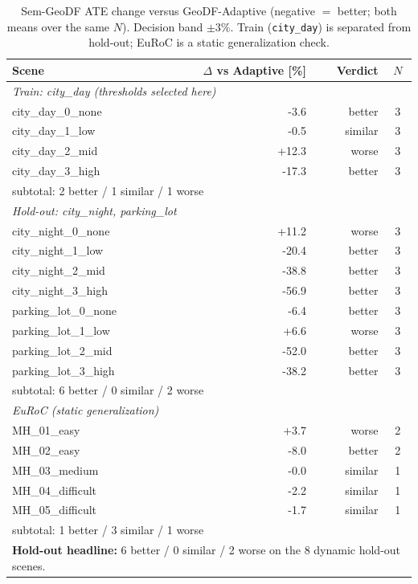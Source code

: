 \begin{table}[t]
\centering
\caption{Sem-GeoDF ATE change versus GeoDF-Adaptive (negative $=$ better; both means over the same $N$). Decision band $\pm 3\%$. Train (\texttt{city\_day}) is separated from hold-out; EuRoC is a static generalization check.}
\label{tab:delta_adaptive}
\begin{tabular}{lrrc}
\toprule
Scene & $\Delta$ vs Adaptive [\%] & Verdict & $N$ \\
\midrule
\multicolumn{4}{l}{\emph{Train: city\_day (thresholds selected here)}} \\
city\_day\_0\_none & -3.6 & better & 3 \\
city\_day\_1\_low & -0.5 & similar & 3 \\
city\_day\_2\_mid & +12.3 & worse & 3 \\
city\_day\_3\_high & -17.3 & better & 3 \\
\multicolumn{4}{l}{\quad subtotal: 2 better / 1 similar / 1 worse} \\
\midrule
\multicolumn{4}{l}{\emph{Hold-out: city\_night, parking\_lot}} \\
city\_night\_0\_none & +11.2 & worse & 3 \\
city\_night\_1\_low & -20.4 & better & 3 \\
city\_night\_2\_mid & -38.8 & better & 3 \\
city\_night\_3\_high & -56.9 & better & 3 \\
parking\_lot\_0\_none & -6.4 & better & 3 \\
parking\_lot\_1\_low & +6.6 & worse & 3 \\
parking\_lot\_2\_mid & -52.0 & better & 3 \\
parking\_lot\_3\_high & -38.2 & better & 3 \\
\multicolumn{4}{l}{\quad subtotal: 6 better / 0 similar / 2 worse} \\
\midrule
\multicolumn{4}{l}{\emph{EuRoC (static generalization)}} \\
MH\_01\_easy & +3.7 & worse & 2 \\
MH\_02\_easy & -8.0 & better & 2 \\
MH\_03\_medium & -0.0 & similar & 1 \\
MH\_04\_difficult & -2.2 & similar & 1 \\
MH\_05\_difficult & -1.7 & similar & 1 \\
\multicolumn{4}{l}{\quad subtotal: 1 better / 3 similar / 1 worse} \\
\midrule
\multicolumn{4}{l}{\textbf{Hold-out headline:} 6 better / 0 similar / 2 worse on the 8 dynamic hold-out scenes.} \\
\bottomrule
\end{tabular}
\end{table}
